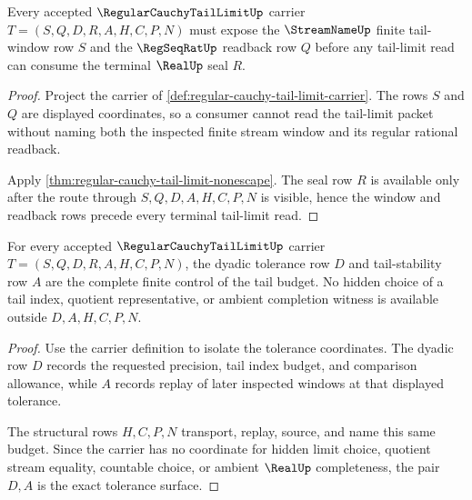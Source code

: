 \begin{theorem}
\label{thm:regular-cauchy-tail-limit-window-exposure}
Every accepted $\RegularCauchyTailLimitUp$ carrier $T=(S,Q,D,R,A,H,C,P,N)$ must expose the $\StreamNameUp$ finite tail-window row $S$ and the $\RegSeqRatUp$ readback row $Q$ before any tail-limit read can consume the terminal $\RealUp$ seal $R$.
\end{theorem}
\begin{proof}
Project the carrier of \autoref{def:regular-cauchy-tail-limit-carrier}. The rows $S$ and $Q$ are displayed coordinates, so a consumer cannot read the tail-limit packet without naming both the inspected finite stream window and its regular rational readback.

Apply \autoref{thm:regular-cauchy-tail-limit-nonescape}. The seal row $R$ is available only after the route through $S,Q,D,A,H,C,P,N$ is visible, hence the window and readback rows precede every terminal tail-limit read.
\end{proof}

\begin{theorem}
\label{thm:regular-cauchy-tail-limit-tolerance-exactness}
For every accepted $\RegularCauchyTailLimitUp$ carrier $T=(S,Q,D,R,A,H,C,P,N)$, the dyadic tolerance row $D$ and tail-stability row $A$ are the complete finite control of the tail budget. No hidden choice of a tail index, quotient representative, or ambient completion witness is available outside $D,A,H,C,P,N$.
\end{theorem}
\begin{proof}
Use the carrier definition to isolate the tolerance coordinates. The dyadic row $D$ records the requested precision, tail index budget, and comparison allowance, while $A$ records replay of later inspected windows at that displayed tolerance.

The structural rows $H,C,P,N$ transport, replay, source, and name this same budget. Since the carrier has no coordinate for hidden limit choice, quotient stream equality, countable choice, or ambient $\RealUp$ completeness, the pair $D,A$ is the exact tolerance surface.
\end{proof}

